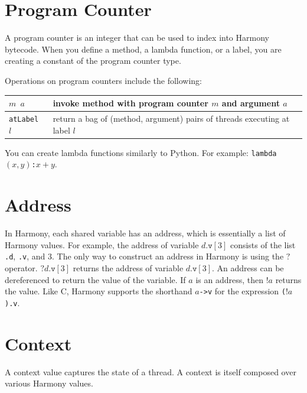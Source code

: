 \documentclass{report}
\begin{document}
\section{Program Counter}

A program counter is an integer that can be used to index into Harmony
bytecode.  When you define a method, a lambda function, or a label,
you are creating a constant of the program counter type.

Operations on program counters include the following:
\begin{center}
\begin{tabular}{|l|l|}
\hline
\texttt{$m$ $a$} & invoke method with program counter $m$ and argument $a$\\
\hline
\texttt{atLabel $l$} & return a bag of (method, argument) pairs of threads executing at label $l$ \\
\hline
\end{tabular}
\end{center}

You can create lambda functions similarly to Python.  For example:
\texttt{lambda$(x,y)$:$x+y$}.

\section{Address}

In Harmony, each shared variable has an address, which is essentially
a list of Harmony values.
For example, the address of variable $d.\mathtt{v}[3]$ consists of the
list \texttt{.d}, \texttt{.v}, and 3.  The only way to construct an
address in Harmony is using the $?$ operator.
$?d.\mathtt{v}[3]$ returns the address of variable $d.\mathtt{v}[3]$.
An address can be dereferenced to return the value of the variable.
If $a$ is an address, then $!a$ returns the value.
Like C, Harmony supports the shorthand \texttt{$a$->v} for 
the expression \texttt{($!a$).v}.

\section{Context}

A context value captures the state of a thread.
A context is itself composed over various Harmony values.
\end{document}

